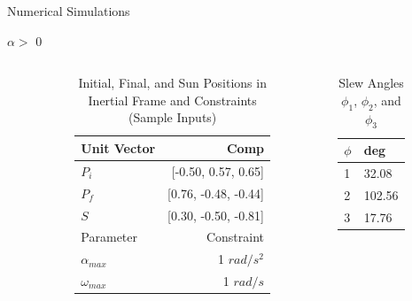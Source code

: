 \documentclass{beamer}
\begin{document}
\begin{frame}{Numerical Simulations}
	\begin{block}{$\alpha >$ 0}
		
		\begin{columns}
			\begin{column}{0.05\textwidth}
			\end{column}
			\begin{column}{0.65\textwidth}
				\begin{center}
					\begin{table}[H]
						\centering
						\caption{Initial, Final, and Sun Positions in Inertial Frame and Constraints (Sample Inputs)}
						\begin{tabular}{lr}
							\toprule
							\midrule
							Unit Vector & Comp \\
							\midrule
							$P_i$ & [-0.50, 0.57, 0.65] \\
							$P_f$ & [0.76, -0.48, -0.44] \\ 
							$S$ & [0.30, -0.50, -0.81] \\
							\midrule
							\midrule
							Parameter & Constraint \\ 
							\midrule
							$\alpha_{max}$ & 1 $rad/s^2$ \\
							$\omega_{max}$ & 1 $rad/s$ \\ 
							\midrule
							\bottomrule
						\end{tabular}%
						\label{tab:Pi_Pf_S}%
					\end{table}
				\end{center}
			\end{column}
			\begin{column}{0.3\textwidth}
				\begin{center}
					\begin{table}[H]
						\centering
						\caption{Slew Angles $\phi_1$, $\phi_2$, and $\phi_3$}
						\begin{tabular}{ll}
							\toprule
							\midrule
							$\phi$ & deg \\
							\midrule
							1 & 32.08 \\
							2 & 102.56 \\ 
							3 & 17.76 \\
							\midrule
							\bottomrule
						\end{tabular}%
						\label{tab:phi_123}%
					\end{table}%
				\end{center}
			\end{column}
		\end{columns}

	\end{block}
\end{frame}
\end{document}

